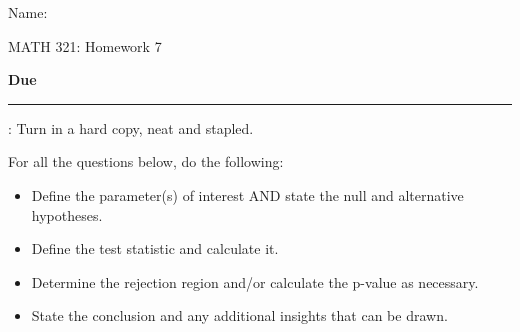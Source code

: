 \documentclass{article}
\newcommand{\blankul}[1]{\rule[-1.5mm]{#1}{0.15mm}}	%
\begin{document}
\hspace{375pt}Name:

\begin{center}
{\Huge MATH 321: Homework 7}
\end{center}

\bigskip\bigskip

{\large \textbf{Due} \blankul{4cm}: Turn in a hard copy, neat and stapled.}\bigskip


For all the questions below, do the following:\bigskip
\begin{itemize}
    \item Define the parameter(s) of interest AND state the null and alternative hypotheses.
    \item Define the test statistic and calculate it.
    \item Determine the rejection region and/or calculate the p-value as necessary.
    \item State the conclusion and any additional insights that can be drawn.
\end{itemize}\bigskip
\end{document}
